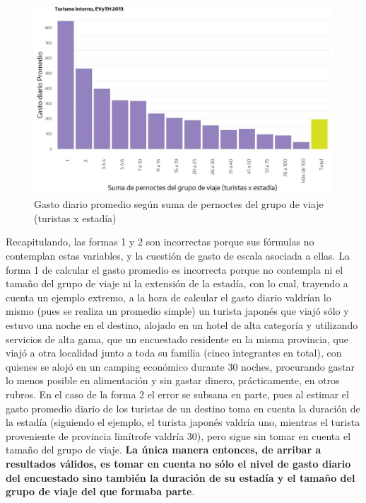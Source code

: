 \documentclass[
]{book}
\begin{document}
\begin{figure}

{\centering \includegraphics[width=1\linewidth,height=1\textheight]{imagenes/DT4_grafico18_c} 

}

\caption{Gasto diario promedio según suma de pernoctes del grupo de viaje (turistas x estadía)}\label{fig:grafico18c}
\end{figure}

Recapitulando, las formas 1 y 2 son incorrectas porque sus fórmulas no contemplan estas variables, y la cuestión de gasto de escala asociada a ellas. La forma 1 de calcular el gasto promedio es incorrecta porque no contempla ni el tamaño del grupo de viaje ni la extensión de la estadía, con lo cual, trayendo a cuenta un ejemplo extremo, a la hora de calcular el gasto diario valdrían lo mismo (pues se realiza un promedio simple) un turista japonés que viajó sólo y estuvo una noche en el destino, alojado en un hotel de alta categoría y utilizando servicios de alta gama, que un encuestado residente en la misma provincia, que viajó a otra localidad junto a toda su familia (cinco integrantes en total), con quienes se alojó en un camping económico durante 30 noches, procurando gastar lo menos posible en alimentación y sin gastar dinero, prácticamente, en otros rubros. En el caso de la forma 2 el error se subsana en parte, pues al estimar el gasto promedio diario de los turistas de un destino toma en cuenta la duración de la estadía (siguiendo el ejemplo, el turista japonés valdría uno, mientras el turista proveniente de provincia limítrofe valdría 30), pero sigue sin tomar en cuenta el tamaño del grupo de viaje. \textbf{La única manera entonces, de arribar a resultados válidos, es tomar en cuenta no sólo el nivel de gasto diario del encuestado sino también la duración de su estadía y el tamaño del grupo de viaje del que formaba parte}.
\end{document}
